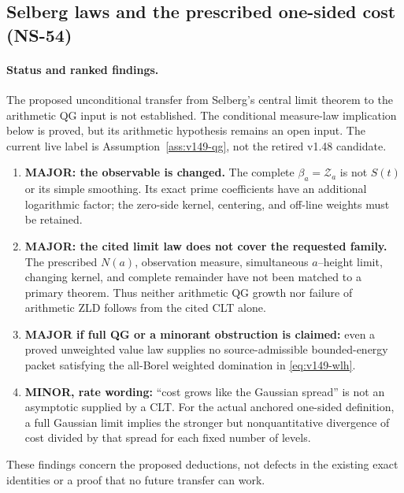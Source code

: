 \subsection*{Selberg laws and the prescribed one-sided cost (NS-54)}
\label{ns54-selberg-sec}

\paragraph{Status and ranked findings.}
The proposed unconditional transfer from Selberg's central limit theorem
to the arithmetic QG input is not established. The conditional
measure-law implication below is proved, but its arithmetic hypothesis
remains an open input. The current live label is
Assumption~\ref{ass:v149-qg}, not the retired v1.48 candidate.
\begin{enumerate}
\item \textbf{MAJOR: the observable is changed.} The complete
$\beta_a=\mathcal Z_a$ is not $S(t)$ or its simple smoothing.
Its exact prime coefficients have an additional logarithmic factor;
the zero-side kernel, centering, and off-line weights must be retained.
\item \textbf{MAJOR: the cited limit law does not cover the requested
family.} The prescribed $N(a)$, observation measure, simultaneous
$a$--height limit, changing kernel, and complete remainder have not
been matched to a primary theorem. Thus neither arithmetic QG growth
nor failure of arithmetic ZLD follows from the cited CLT alone.
\item \textbf{MAJOR if full QG or a minorant obstruction is claimed:}
even a proved unweighted value law supplies no source-admissible
bounded-energy packet satisfying the all-Borel weighted domination
in \eqref{eq:v149-wlh}.
\item \textbf{MINOR, rate wording:} ``cost grows like the Gaussian
spread'' is not an asymptotic supplied by a CLT. For the actual
anchored one-sided definition, a full Gaussian limit implies the
stronger but nonquantitative divergence of cost divided by that spread
for each fixed number of levels.
\end{enumerate}
These findings concern the proposed deductions, not defects in the
existing exact identities or a proof that no future transfer can work.

